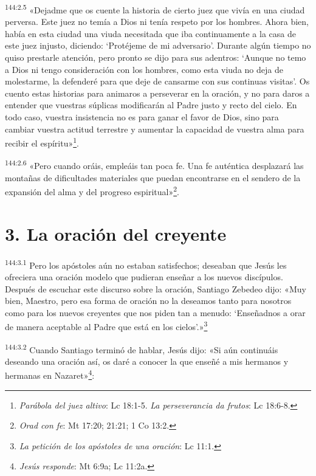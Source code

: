 \par 
\textsuperscript{144:2.5} «Dejadme que os cuente la historia de cierto juez que vivía en una ciudad perversa. Este juez no temía a Dios ni tenía respeto por los hombres. Ahora bien, había en esta ciudad una viuda necesitada que iba continuamente a la casa de este juez injusto, diciendo: `Protéjeme de mi adversario'. Durante algún tiempo no quiso prestarle atención, pero pronto se dijo para sus adentros: `Aunque no temo a Dios ni tengo consideración con los hombres, como esta viuda no deja de molestarme, la defenderé para que deje de cansarme con sus continuas visitas'. Os cuento estas historias para animaros a perseverar en la oración, y no para daros a entender que vuestras súplicas modificarán al Padre justo y recto del cielo. En todo caso, vuestra insistencia no es para ganar el favor de Dios, sino para cambiar vuestra actitud terrestre y aumentar la capacidad de vuestra alma para recibir el espíritu»\footnote{\textit{Parábola del juez altivo}: Lc 18:1-5. \textit{La perseverancia da frutos}: Lc 18:6-8.}.

\par 
\textsuperscript{144:2.6} «Pero cuando oráis, empleáis tan poca fe. Una fe auténtica desplazará las montañas de dificultades materiales que puedan encontrarse en el sendero de la expansión del alma y del progreso espiritual»\footnote{\textit{Orad con fe}: Mt 17:20; 21:21; 1 Co 13:2.}.

\section*{3. La oración del creyente}
\par 
\textsuperscript{144:3.1} Pero los apóstoles aún no estaban satisfechos; deseaban que Jesús les ofreciera una oración modelo que pudieran enseñar a los nuevos discípulos. Después de escuchar este discurso sobre la oración, Santiago Zebedeo dijo: «Muy bien, Maestro, pero esa forma de oración no la deseamos tanto para nosotros como para los nuevos creyentes que nos piden tan a menudo: `Enseñadnos a orar de manera aceptable al Padre que está en los cielos'.»\footnote{\textit{La petición de los apóstoles de una oración}: Lc 11:1.}

\par 
\textsuperscript{144:3.2} Cuando Santiago terminó de hablar, Jesús dijo: «Si aún continuáis deseando una oración así, os daré a conocer la que enseñé a mis hermanos y hermanas en Nazaret»\footnote{\textit{Jesús responde}: Mt 6:9a; Lc 11:2a.}:

